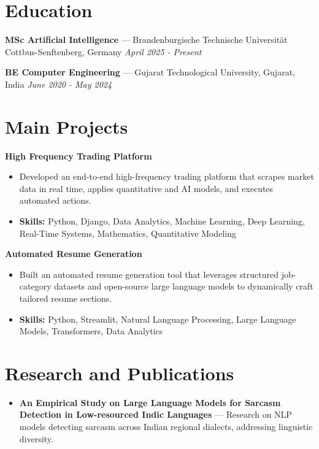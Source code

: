 \documentclass[a4paper,10pt]{article}
\begin{document}
\section*{Education}
\textbf{MSc Artificial Intelligence} — Brandenburgische Technische Universität Cottbus-Senftenberg, Germany \hfill \textit{April 2025 - Present}\par
\vspace{1.5pt}
\textbf{BE Computer Engineering} — Gujarat Technological University, Gujarat, India \hfill \textit{June 2020 - May 2024}\par

\section*{Main Projects}
\textbf{High Frequency Trading Platform}\par
\vspace{1pt}
\begin{itemize}
  \item Developed an end-to-end high-frequency trading platform that scrapes market data in real time, applies quantitative and AI models, and executes automated actions.
  \item \textbf{Skills:} Python, Django, Data Analytics, Machine Learning, Deep Learning, Real-Time Systems, Mathematics, Quantitative Modeling
\end{itemize}
\vspace{3pt}
\textbf{Automated Resume Generation}\par
\vspace{1pt}
\begin{itemize}
  \item Built an automated resume generation tool that leverages structured job-category datasets and open-source large language models to dynamically craft tailored resume sections.
  \item \textbf{Skills:} Python, Streamlit, Natural Language Processing, Large Language Models, Transformers, Data Analytics
\end{itemize}

\section*{Research and Publications}
\begin{itemize}
\item \textbf{An Empirical Study on Large Language Models for Sarcasm Detection in Low-resourced Indic Languages} — Research on NLP models detecting sarcasm across Indian regional dialects, addressing linguistic diversity.
\end{itemize}
\end{document}
